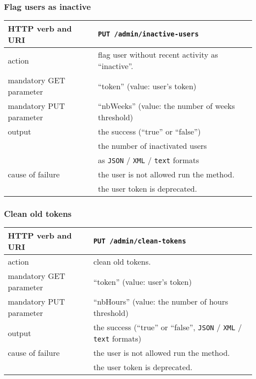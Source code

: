 \subsubsection{Flag users as inactive}
\begin{tabular}{ | l | l | }
	\hline
	HTTP verb and URI & \texttt{PUT /admin/inactive-users} \\
	\hline
	action & flag user without recent activity as ``inactive''. \\
	\hline
	mandatory GET parameter & ``token'' (value: user's token) \\
	\hline
	mandatory PUT parameter & ``nbWeeks'' (value: the number of weeks threshold) \\
	\hline
	output & the success (``true'' or ``false'') \\
	\space & the number of inactivated users \\
	\space & as \texttt{JSON} / \texttt{XML} / \texttt{text} formats \\
	\hline
	cause of failure & the user is not allowed run the method. \\
	\space & the user token is deprecated. \\
	\hline
\end{tabular}
\newline

\subsubsection{Clean old tokens}
\begin{tabular}{ | l | l | }
	\hline
	HTTP verb and URI & \texttt{PUT /admin/clean-tokens} \\
	\hline
	action & clean old tokens. \\
	\hline
	mandatory GET parameter & ``token'' (value: user's token) \\
	\hline
	mandatory PUT parameter & ``nbHours'' (value: the number of hours threshold) \\
	\hline
	output & the success (``true'' or ``false'', \texttt{JSON} / \texttt{XML} / \texttt{text} formats) \\
	\hline
	cause of failure & the user is not allowed run the method. \\
	\space & the user token is deprecated. \\
	\hline
\end{tabular}
\newline

